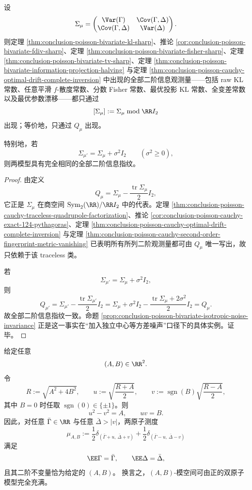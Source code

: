 \begin{theorem}\label{thm:conclusion-poisson-cauchy-traceless-class-sufficiency}
设
\[
\Sigma_\mu=
\begin{pmatrix}
\Var(\Gamma) & \Cov(\Gamma,\Delta)\\
\Cov(\Gamma,\Delta) & \Var(\Delta)
\end{pmatrix}.
\]
则定理 \ref{thm:conclusion-poisson-bivariate-kl-sharp}、推论 \ref{cor:conclusion-poisson-bivariate-fdiv-sharp}、定理 \ref{thm:conclusion-poisson-bivariate-fisher-sharp}、定理 \ref{thm:conclusion-poisson-bivariate-tv-sharp}、定理 \ref{thm:conclusion-poisson-bivariate-information-projection-halving} 与定理 \ref{thm:conclusion-poisson-cauchy-optimal-drift-complete-inversion} 中出现的全部二阶信息观测量——包括 raw KL 常数、任意平滑 \(f\)-散度常数、分数 Fisher 常数、最优投影 KL 常数、全变差常数以及最优参数漂移——都只通过
\[
[\Sigma_\mu]:=\Sigma_\mu \bmod \RR I_2
\]
出现；等价地，只通过 \(Q_\mu\) 出现。

特别地，若
\[
\Sigma_{\mu'}=\Sigma_\mu+\sigma^2 I_2
\qquad(\sigma^2\ge 0),
\]
则两模型具有完全相同的全部二阶信息指纹。
\end{theorem}

\begin{proof}
由定义
\[
Q_\mu=\Sigma_\mu-\frac{\operatorname{tr}\Sigma_\mu}{2}I_2,
\]
它正是 \(\Sigma_\mu\) 在商空间 \(\mathrm{Sym}_2(\RR)/\RR I_2\) 中的代表。定理 \ref{thm:conclusion-poisson-cauchy-traceless-quadrupole-factorization}、推论 \ref{cor:conclusion-poisson-cauchy-exact-124-pythagoras}、定理 \ref{thm:conclusion-poisson-cauchy-optimal-drift-complete-inversion} 与定理 \ref{thm:conclusion-poisson-cauchy-second-order-fingerprint-metric-vanishing} 已表明所有所列二阶观测量都可由 \(Q_\mu\) 唯一写出，故只依赖于该 traceless 类。

若
\[
\Sigma_{\mu'}=\Sigma_\mu+\sigma^2 I_2,
\]
则
\[
Q_{\mu'}
=
\Sigma_{\mu'}-\frac{\operatorname{tr}\Sigma_{\mu'}}{2}I_2
=
\Sigma_\mu+\sigma^2 I_2-\frac{\operatorname{tr}\Sigma_\mu+2\sigma^2}{2}I_2
=
Q_\mu.
\]
故全部二阶信息指纹一致。命题 \ref{prop:conclusion-poisson-bivariate-isotropic-noise-invariance} 正是这一事实在“加入独立中心等方差噪声”口径下的具体实例。证毕。
\end{proof}

\begin{theorem}\label{thm:conclusion-poisson-cauchy-traceless-plane-twoatomic-surjection}
给定任意
\[
(A,B)\in\RR^2.
\]
令
\[
R:=\sqrt{A^2+4B^2},
\qquad
u:=\sqrt{\frac{R+A}{2}},
\qquad
v:=\operatorname{sgn}(B)\sqrt{\frac{R-A}{2}},
\]
其中 \(B=0\) 时任取 \(\operatorname{sgn}(0)\in\{\pm1\}\)。则
\[
u^2-v^2=A,
\qquad
uv=B.
\]
因此，对任意 \(\bar\Gamma\in\RR\) 与任意 \(\bar\Delta>|v|\)，两原子测度
\[
\mu_{A,B}:=
\frac12\delta_{(\bar\Gamma+u,\ \bar\Delta+v)}
+
\frac12\delta_{(\bar\Gamma-u,\ \bar\Delta-v)}
\]
满足
\[
\EE\Gamma=\bar\Gamma,\qquad \EE\Delta=\bar\Delta,
\]
且其二阶不变量恰为给定的 \((A,B)\)。
换言之，\((A,B)\)-模空间可由正的双原子模型完全充满。
\end{theorem}

